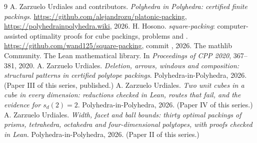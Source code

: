 \documentclass[11pt,a4paper]{article}
\begin{document}
\begin{thebibliography}{9}
 A. Zarzuelo Urdiales and contributors. \emph{Polyhedra in Polyhedra: certified finite packings}. \url{https://github.com/alejandrozu/platonic-packing}, \url{https://polyhedrainpolyhedra.wiki}, 2026.
 H. Hosono. \emph{square-packing}: computer-assisted optimality proofs for cube packings, problems  and . \url{https://github.com/wand125/square-packing}, commit , 2026.
 The mathlib Community. The Lean mathematical library. In \emph{Proceedings of CPP 2020}, 367--381, 2020.
 A. Zarzuelo Urdiales. \emph{Deletion, arrows, windows and composition: structural patterns in certified polytope packings}. Polyhedra-in-Polyhedra, 2026. (Paper III of this series, published.)
 A. Zarzuelo Urdiales. \emph{Two unit cubes in a cube in every dimension: reductions checked in Lean, routes that fail, and the evidence for $s_d(2)=2$}. Polyhedra-in-Polyhedra, 2026. (Paper IV of this series.)
 A. Zarzuelo Urdiales. \emph{Width, facet and ball bounds: thirty optimal packings of prisms, tetrahedra, octahedra and four-dimensional polytopes, with proofs checked in Lean}. Polyhedra-in-Polyhedra, 2026. (Paper II of this series.)
\end{thebibliography}
\end{document}
